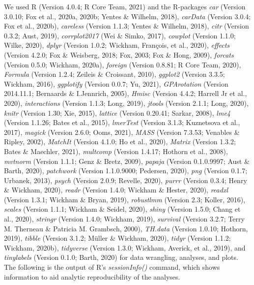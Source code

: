 \documentclass[
  english,
  man, noextraspace]{apa7}
\begin{document}
\begin{appendix}
We used R (Version 4.0.4; R Core Team, 2021) and the R-packages
\emph{car} (Version 3.0.10; Fox et al., 2020a, 2020b; Yentes \& Wilhelm,
2018), \emph{carData} (Version 3.0.4; Fox et al., 2020b),
\emph{careless} (Version 1.1.3; Yentes \& Wilhelm, 2018), \emph{citr}
(Version 0.3.2; Aust, 2019), \emph{corrplot2017} (Wei \& Simko, 2017),
\emph{cowplot} (Version 1.1.0; Wilke, 2020), \emph{dplyr} (Version
1.0.2; Wickham, François, et al., 2020), \emph{effects} (Version 4.2.0;
Fox \& Weisberg, 2018; Fox, 2003; Fox \& Hong, 2009), \emph{forcats}
(Version 0.5.0; Wickham, 2020a), \emph{foreign} (Version 0.8.81; R Core
Team, 2020), \emph{Formula} (Version 1.2.4; Zeileis \& Croissant, 2010),
\emph{ggplot2} (Version 3.3.5; Wickham, 2016), \emph{ggplotify} (Version
0.0.7; Yu, 2021), \emph{GPArotation} (Version 2014.11.1; Bernaards \&
I.Jennrich, 2005), \emph{Hmisc} (Version 4.4.2; Harrell Jr et al.,
2020), \emph{interactions} (Version 1.1.3; Long, 2019), \emph{jtools}
(Version 2.1.1; Long, 2020), \emph{knitr} (Version 1.30; Xie, 2015),
\emph{lattice} (Version 0.20.41; Sarkar, 2008), \emph{lme4} (Version
1.1.26; Bates et al., 2015), \emph{lmerTest} (Version 3.1.3; Kuznetsova
et al., 2017), \emph{magick} (Version 2.6.0; Ooms, 2021), \emph{MASS}
(Version 7.3.53; Venables \& Ripley, 2002), \emph{MatchIt} (Version
4.1.0; Ho et al., 2020), \emph{Matrix} (Version 1.3.2; Bates \&
Maechler, 2021), \emph{multcomp} (Version 1.4.17; Hothorn et al., 2008),
\emph{mvtnorm} (Version 1.1.1; Genz \& Bretz, 2009), \emph{papaja}
(Version 0.1.0.9997; Aust \& Barth, 2020), \emph{patchwork} (Version
1.1.0.9000; Pedersen, 2020), \emph{png} (Version 0.1.7; Urbanek, 2013),
\emph{psych} (Version 2.0.9; Revelle, 2020), \emph{purrr} (Version
0.3.4; Henry \& Wickham, 2020), \emph{readr} (Version 1.4.0; Wickham \&
Hester, 2020), \emph{readxl} (Version 1.3.1; Wickham \& Bryan, 2019),
\emph{robustlmm} (Version 2.3; Koller, 2016), \emph{scales} (Version
1.1.1; Wickham \& Seidel, 2020), \emph{shiny} (Version 1.5.0; Chang et
al., 2020), \emph{stringr} (Version 1.4.0; Wickham, 2019),
\emph{survival} (Version 3.2.7; Terry M. Therneau \& Patricia M.
Grambsch, 2000), \emph{TH.data} (Version 1.0.10; Hothorn, 2019),
\emph{tibble} (Version 3.1.2; Müller \& Wickham, 2020), \emph{tidyr}
(Version 1.1.2; Wickham, 2020b), \emph{tidyverse} (Version 1.3.0;
Wickham, Averick, et al., 2019), and \emph{tinylabels} (Version 0.1.0;
Barth, 2020) for data wrangling, analyses, and plots.\\
The following is the output of R's \emph{sessionInfo()} command, which
shows information to aid analytic reproducibility of the analyses.


\end{appendix}
\end{document}
